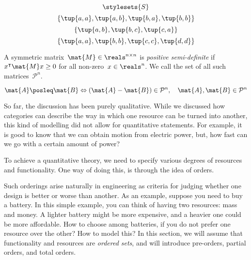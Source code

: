 {\begin{forslides}
\begin{equation*}
            \label{eq:pow_7}
            \stylesets{S}
        \end{equation*}
        \begin{equation*}
            \label{eq:pre_ex1}
            \{\tup{a,a},\tup{a,b},\tup{b,a},\tup{b,b}\}
        \end{equation*}
        \begin{equation*}
            \label{eq:pre_ex2}
            \{\tup{a,b},\tup{b,c},\tup{c,a}\}
        \end{equation*}
        \begin{equation*}
            \label{eq:pre_ex3}
            \{\tup{a,a},\tup{b,b},\tup{c,c},\tup{d,d}\}
        \end{equation*}
        \begin{definition}
            \label{def:posdef}
            A symmetric matrix~$\mat{M}\in \reals^{n\times n}$ is \emph{positive semi-definite} if~$x^\intercal \mat{M}x\geq 0$ for all non-zero~$x\in \reals^n$.
            We call the set of all such matrices~$\mathcal{P}^n$.
        \end{definition}
        \begin{equation*}
            \label{eq:posdef_1}
            \mat{A}\posleq \mat{B} \Leftrightarrow (\mat{A}-\mat{B})\in \mathcal{P}^n, \quad \mat{A},\mat{B}\in \mathcal{P}^n
        \end{equation*}
    \end{forslides}
}

So far, the discussion has been purely qualitative.
While we discussed how categories can describe the way in which one resource can be turned into another, this kind of modelling did not allow for quantitative statements.
For example, it is good to know that we can obtain motion from electric power, but, how fast can we go with a certain amount of power?

To achieve a quantitative theory, we need to specify various degrees of resources and functionality.
One way of doing this, is through the idea of orders.

Such orderings arise naturally in engineering as criteria for judging whether one design is better or worse than another.
As an example, suppose you need to buy a battery.
In this simple example, you can think of having two resources: mass and money.
A lighter battery might be more expensive, and a heavier one could be more affordable.
How to choose among batteries, if you do not prefer one resource over the other?
How to model this?
In this section, we will assume that functionality and resources are \emph{ordered sets}, and will introduce pre-orders, partial orders, and total orders.

